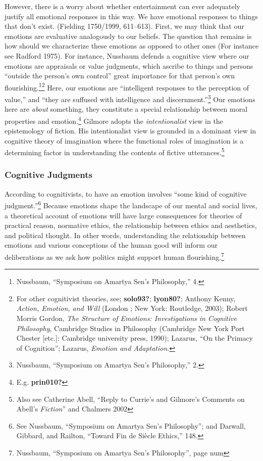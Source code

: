 \documentclass[
  12pt,
]{book}
\theoremstyle{definition}
\theoremstyle{definition}
\theoremstyle{definition}
\theoremstyle{definition}
\theoremstyle{remark}
\begin{document}
However, there is a worry about whether entertainment can ever adequately justify all emotional responses in this way. We have emotional responses to things that don't exist. (Fielding 1750/1999, 611--613). First, we may think that our emotions are evaluative analogously to our beliefs. The question that remains is how should we characterize these emotions as opposed to other ones (For instance see Radford 1975). For instance, Nussbaum defends a cognitive view where our emotions are appraisals or value judgments, which ascribe to things and persons ``outside the person's own control'' great importance for that person's own flourishing.\footnote{Nussbaum, {``Symposium on {Amartya Sen}'s Philosophy,''} 4.}\footnote{For other cognitivist theories, see; \textbf{solo93?}; \textbf{lyon80?}; Anthony Kenny, \emph{Action, Emotion, and Will} (London ; New York: Routledge, 2003); Robert Morris Gordon, \emph{The Structure of Emotions: Investigations in Cognitive Philosophy}, Cambridge Studies in Philosophy (Cambridge New York Port Chester {[}etc.{]}: Cambridge university press, 1990); Lazarus, {``On the {Primacy} of {Cognition}''}; Lazarus, \emph{Emotion and Adaptation}.} Here, our emotions are ``intelligent responses to the perception of value,'' and ``they are suffused with intelligence and discernment.''\footnote{Nussbaum, {``Symposium on {Amartya Sen}'s Philosophy,''} 2.} Our emotions here are \emph{about} something, they constitute a special relationship between moral properties and emotion.\footnote{E.g. \textbf{prin010?}} Gilmore adopts the \emph{intentionalist} view in the epistemology of fiction. His intentionalist view is grounded in a dominant view in cognitive theory of imagination where the functional roles of imagination is a determining factor in understanding the contents of fictive utterances.\footnote{Also see Catherine Abell, {``Reply to {Currie}'s and {Gilmore}'s Comments on {Abell}'s {\emph{Fiction}}''} and Chalmers 2002}

\subsubsection*{Cognitive Judgments}\label{cognitive-judgments}

According to cognitivists, to have an emotion involves ``some kind of cognitive judgment.''\footnote{See Nussbaum, {``Symposium on {Amartya Sen}'s Philosophy''}; and Darwall, Gibbard, and Railton, {``Toward Fin de Siècle Ethics,''} 148.} Because emotions shape the landscape of our mental and social lives, a theoretical account of emotions will have large consequences for theories of practical reason, normative ethics, the relationship between ethics and aesthetics, and political thought. In other words, understanding the relationship between emotions and various conceptions of the human good will inform our deliberations as we ask how politics might support human flourishing.\footnote{Nussbaum, {``Symposium on {Amartya Sen}'s Philosophy''}, page num}
\end{document}
